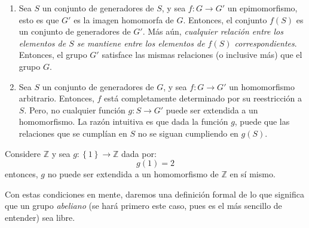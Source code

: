 \documentclass[12pt]{report}
\newcounter{it}
\theoremstyle{largebreak}
\newcommand\cf[3]{\ensuremath{#1:#2\rightarrow#3}}
\begin{document}
    \renewcommand{\theenumi}{\arabic{enumi}}
    \begin{enumerate}
        \item Sea $S$ un conjunto de generadores de $S$, y sea $\cf{f}{G}{G'}$ un epimomorfismo, esto es que $G'$ es la imagen homomorfa de $G$. Entonces, el conjunto $f(S)$ es un conjunto de generadores de $G'$. Más aún, \textit{cualquier relación entre los elementos de $S$ se mantiene entre los elementos de $f(S)$ correspondientes}. Entonces, el grupo $G'$ satisface las mismas relaciones (o inclusive más) que el grupo $G$.
        \item Sea $S$ un conjunto de generadores de $G$, y sea $\cf{f}{G}{G'}$ un homomorfismo arbitrario. Entonces, $f$ está completamente determinado por su reestricción a $S$. Pero, no cualquier función $\cf{g}{S}{G'}$ puede ser extendida a un homomorfismo. La razón intuitiva es que dada la función $g$, puede que las relaciones que se cumplían en $S$ no se siguan cumpliendo en $g(S)$.
    \end{enumerate}

    \begin{exa}
        Considere $\mathbb{Z}$ y sea $\cf{g}{\left\{1\right\}}{\mathbb{Z}}$ dada por:
        \begin{equation*}
            g(1)=2
        \end{equation*}
        entonces, $g$  no puede ser extendida a un homomorfismo de $\mathbb{Z}$ en sí mismo.
    \end{exa}

    Con estas condiciones en mente, daremos una definición formal de lo que significa que un grupo \textit{abeliano} (se hará primero este caso, pues es el más sencillo de entender) sea libre.
\end{document}

